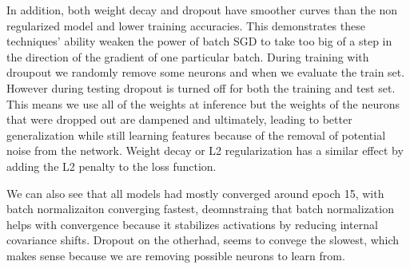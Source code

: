 \documentclass{article}
\begin{document}
In addition, both weight decay and dropout have smoother curves than the non regularized model and lower training accuracies. This demonstrates these techniques' ability weaken the power of batch SGD to take too big of a step in the direction of the gradient of one particular batch. During training with droupout we randomly remove some neurons and when we evaluate the train set. However during testing dropout is turned off for both the training and test set. This means we use all of the weights at inference but the weights of the neurons that were dropped out are dampened and ultimately, leading to better generalization while still learning features because of the removal of potential noise from the network. Weight decay or L2 regularization has a similar effect by adding the L2 penalty to the loss function. 

We can also see that all models had mostly converged around epoch 15, with batch normalizaiton converging fastest, deomnstraing that batch normalization helps with convergence because it stabilizes activations by reducing internal covariance shifts. Dropout on the otherhad, seems to convege the slowest, which makes sense because we are removing possible neurons to learn from. 
\end{document}
